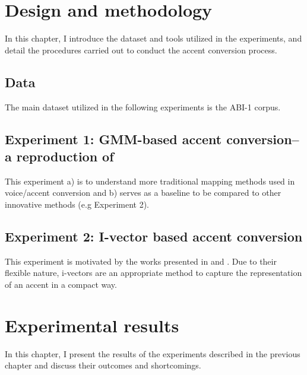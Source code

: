 \documentclass
[
    a4paper,
    twoside,
    12pt
]
{report}
\begin{document}
\chapter{Design and methodology}

In this chapter, I introduce the dataset and tools utilized in the
experiments, and detail the procedures carried out to conduct the accent
conversion process.

\section{Data}\label{data}

The main dataset utilized in the following experiments is the ABI-1
corpus.

\section{\texorpdfstring{Experiment 1: GMM-based accent conversion-- a
reproduction of
\textcite{aryal2014}}{Experiment 1: GMM-based accent conversion-- a reproduction of }}\label{experiment-1-gmm-based-accent-conversion-a-reproduction-of}

This experiment a) is to understand more traditional mapping methods
used in voice/accent conversion and b) serves as a baseline to be
compared to other innovative methods (e.g Experiment 2).

\section{Experiment 2: I-vector based accent
conversion}\label{experiment-2-i-vector-based-accent-conversion}

This experiment is motivated by the works presented in \textcite{wu2016}
and \textcite{kinnunen2017}. Due to their flexible nature, i-vectors are
an appropriate method to capture the representation of an accent in a
compact way.
\cleardoublepage
\chapter{Experimental results}

In this chapter, I present the results of the experiments described in
the previous chapter and discuss their outcomes and shortcomings.
\cleardoublepage
% 
% 

\printbibliography
\end{document}
